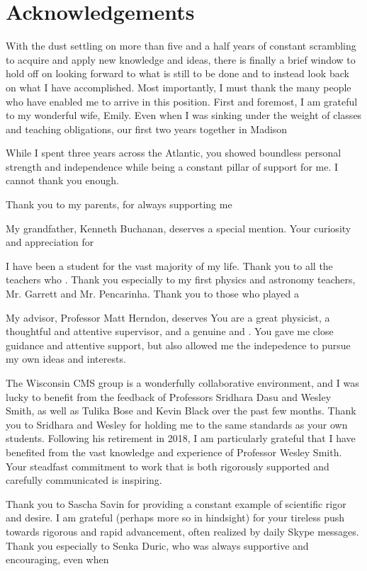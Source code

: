 \section{Acknowledgements}

With the dust settling on more than five and a half years 
of constant scrambling to acquire and apply new knowledge and ideas,
there is finally a brief window to hold off on looking forward
to what is still to be done and to instead look back on what I have 
accomplished. Most importantly, I must thank the many people who have
enabled me to arrive in this position. First and foremost, I am grateful
to my wonderful wife, Emily. Even when I was sinking under the weight
of classes and teaching obligations, our first two years together in Madison

While I spent three years across the Atlantic, you showed boundless
personal strength and independence while being a constant pillar of 
support for me. I cannot thank you enough.

Thank you to my parents, for always supporting me

My grandfather, Kenneth Buchanan, deserves a special mention. Your curiosity
and appreciation for 


I have been a student for the vast majority of my life. Thank you to all the
teachers who . Thank you especially to my first physics and astronomy teachers,
Mr. Garrett and Mr. Pencarinha. 
Thank you to those who played a 

My advisor, Professor Matt Herndon, deserves 
You are a great physicist, a thoughtful and attentive supervisor,
and a genuine and . You gave me close guidance and attentive support, but
also allowed me the indepedence to pursue my own ideas and interests.

The Wisconsin CMS group is a wonderfully collaborative environment,
and I was lucky to benefit from the feedback of Professors Sridhara Dasu
and Wesley Smith, as well as Tulika Bose and Kevin Black over the past few months. 
Thank you to Sridhara and Wesley for holding me to the same standards 
as your own students. Following his retirement in 2018, 
I am particularly grateful that I have benefited 
from the vast knowledge and experience of Professor Wesley Smith.
Your steadfast commitment to work that is both rigorously
supported and carefully communicated is inspiring.

Thank you to Sascha Savin for providing a constant example of scientific
rigor and desire.  
I am grateful (perhaps more so in hindsight) for your tireless push
towards rigorous and rapid advancement, often realized by daily Skype
messages.
Thank you especially to Senka Duric, who was always supportive and
encouraging, even when 


